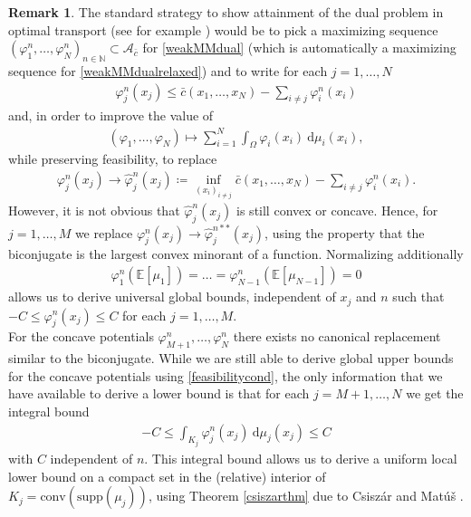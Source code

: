 \documentclass[letterpaper]{amsart}
\newcommand{\NN}{\mathbb{N}}
\newcommand{\EE}{\mathbb{E}}
\newcommand{\dd}{\mathrm{d}}
\theoremstyle{definition}
\newtheorem{rmk}[thm]{Remark}
\begin{document}
\begin{rmk}\label{attainmentlmarmk}
	The standard strategy to show attainment of the dual problem in optimal transport (see for example \cite[Prop 1.11]{santambrogio2015}) would be to pick a maximizing sequence $(\varphi_1^n,\dots,\varphi_N^n)_{n\in\NN}\subset\mathcal A_{\bar c}$ for \eqref{weakMMdual} (which is automatically a maximizing sequence for \eqref{weakMMdualrelaxed}) and to write for each $j=1,\dots,N$
	\begin{gather}\label{feasibilitycond}
		\varphi_j^n(x_j)\leq\bar c(x_1,\dots,x_N)-\sum_{i\neq j}\varphi_i^n(x_i)
	\end{gather}
	and, in order to improve the value of
	\begin{gather*}
		(\varphi_1,\dots,\varphi_N)\mapsto\sum_{i=1}^N\int_\Omega\varphi_i(x_i)\ \dd\mu_i(x_i),
	\end{gather*}
	while preserving feasibility, to replace
	\begin{gather*}
		\varphi_j^n(x_j)\rightarrow\hat\varphi_j^n(x_j)\coloneqq \inf_{(x_i)_{i\neq j}}\bar c(x_1,\dots,x_N)-\sum_{i\neq j}\varphi_i^n(x_i).
	\end{gather*}
	However, it is not obvious that $\hat\varphi_j^n(x_j)$ is still convex or concave. Hence, for $j=1,\dots,M$ we replace $\varphi_j^n(x_j)\rightarrow\hat\varphi_j^{n**}(x_j)$, using the property that the biconjugate is the largest convex minorant of a function. Normalizing additionally
	\begin{gather*}
		\varphi_1^n(\EE[\mu_1])=\dots=\varphi_{N-1}^n(\EE[\mu_{N-1}])=0
	\end{gather*}
	allows us to derive universal global bounds, independent of $x_j$ and $n$ such that $-C\leq \varphi_j^n(x_j)\leq C$ for each $j=1,\dots,M$.\\
	For the concave potentials $\varphi_{M+1}^n,\dots,\varphi_N^n$ there exists no canonical replacement similar to the biconjugate. While we are still able to derive global upper bounds for the concave potentials using \eqref{feasibilitycond}, the only information that we have available to derive a lower bound is that for each $j=M+1,\dots,N$ we get the integral bound
	\begin{gather*}
		-C\leq \int_{K_j}\varphi_j^n(x_j)\ \dd\mu_j(x_j)\leq C
	\end{gather*}
	with $C$ independent of $n$. This integral bound allows us to derive a uniform local lower bound on a compact set in the (relative) interior of $K_j=\text{conv}(\text{supp}(\mu_j))$, using Theorem \ref{csiszarthm} due to Csiszár and Matú\v{s} \cite{csiszar2001}.\\

\end{rmk}
\end{document}
